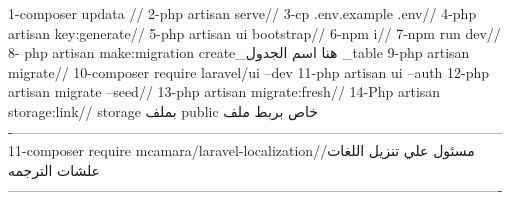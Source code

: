 1-composer updata //
2-php artisan serve//
3-cp .env.example .env//
4-php artisan key:generate//
5-php artisan ui bootstrap//
6-npm i//
7-npm run dev//
8- php artisan make:migration create_هنا اسم الجدول _table
9-php artisan migrate//
10-composer require laravel/ui --dev
11-php artisan ui --auth
12-php artisan migrate --seed//
13-php artisan migrate:fresh//
14-Php artisan storage:link// storage بملف public  خاص بربط ملف 
----------------------------------------------------------------------------------------------------------
11-composer require mcamara/laravel-localization//مسئول علي تنزيل اللغات علشات الترجمه 
----------------------------------------------------------------------------------------------------------

